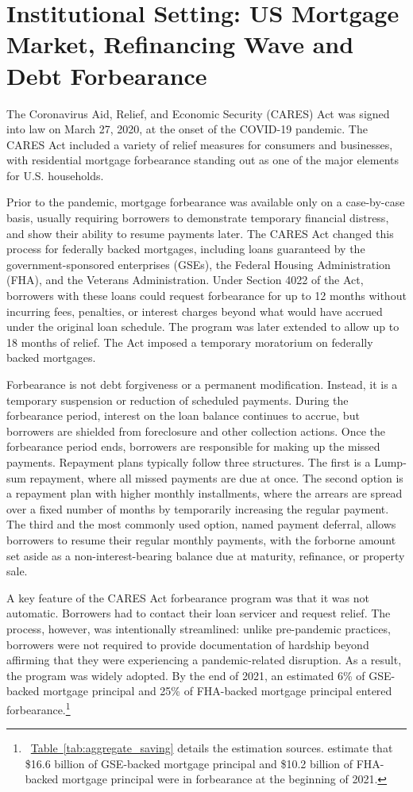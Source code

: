 \documentclass[11pt]{article}
\begin{document}
\section{Institutional Setting: US Mortgage Market, Refinancing Wave and Debt Forbearance} \label{sec:background}

The Coronavirus Aid, Relief, and Economic Security (CARES) Act was signed into law on March 27, 2020, at the onset of the COVID-19 pandemic. The CARES Act included a variety of relief measures for consumers and businesses, with residential mortgage forbearance standing out as one of the major elements for U.S. households.

Prior to the pandemic, mortgage forbearance was available only on a case-by-case basis, usually requiring borrowers to demonstrate temporary financial distress, and show their ability to resume payments later. The CARES Act changed this process for federally backed mortgages, including loans guaranteed by the government-sponsored enterprises (GSEs), the Federal Housing Administration (FHA), and the Veterans Administration. Under Section 4022 of the Act, borrowers with these loans could request forbearance for up to 12 months without incurring fees, penalties, or interest charges beyond what would have accrued under the original loan schedule. The program was later extended to allow up to 18 months of relief. The Act imposed a temporary moratorium on federally backed mortgages.

Forbearance is not debt forgiveness or a permanent modification. Instead, it is a temporary suspension or reduction of scheduled payments. During the forbearance period, interest on the loan balance continues to accrue, but borrowers are shielded from foreclosure and other collection actions. Once the forbearance period ends, borrowers are responsible for making up the missed payments. Repayment plans typically follow three structures. The first is a
Lump-sum repayment, where all missed payments are due at once. The second option is a repayment plan with higher monthly installments, where the arrears are spread over a fixed number of months by temporarily increasing the regular payment. The third and the most commonly used option, named payment deferral,  allows borrowers to resume their regular monthly payments, with the forborne amount set aside as a non-interest-bearing balance due at maturity, refinance, or property sale.

A key feature of the CARES Act forbearance program was that it was not automatic. Borrowers had to contact their loan servicer and request relief. The process, however, was intentionally streamlined: unlike pre-pandemic practices, borrowers were not required to provide documentation of hardship beyond affirming that they were experiencing a pandemic-related disruption. As a result, the program was widely adopted. By the end of 2021, an estimated 6\% of GSE-backed mortgage principal and 25\% of FHA-backed mortgage principal entered forbearance.\footnote{~\hyperref[tab:aggregate_saving]{Table~\ref{tab:aggregate_saving}} details the estimation sources. \citet{cherry2021government} estimate that \$16.6 billion of GSE-backed mortgage principal and \$10.2 billion of FHA-backed mortgage principal were in forbearance at the beginning of 2021.}
\end{document}

